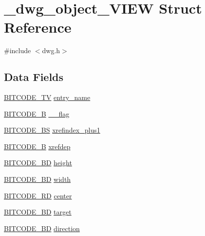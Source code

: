 \hypertarget{struct__dwg__object__VIEW}{\section{\-\_\-dwg\-\_\-object\-\_\-\-V\-I\-E\-W \-Struct \-Reference}
\label{struct__dwg__object__VIEW}
}


{\ttfamily \#include $<$dwg.\-h$>$}

\subsection*{\-Data \-Fields}
\begin{DoxyCompactItemize}
\item 
\hyperlink{dwg_8h_a2a7e040c6e36ca039b03608679ecaf7c}{\-B\-I\-T\-C\-O\-D\-E\-\_\-\-T\-V} \hyperlink{struct__dwg__object__VIEW_a34dffbd307472fa22e0412e245f2cf32}{entry\-\_\-name}
\item 
\hyperlink{dwg_8h_ab533b1f62d9086749e3bb5b67e9f224e}{\-B\-I\-T\-C\-O\-D\-E\-\_\-\-B} \hyperlink{struct__dwg__object__VIEW_a859a13eb3187861575764a50245f8a14}{\-\_\-\_\-flag}
\item 
\hyperlink{dwg_8h_a94297606fbd4a4ff97e8add284af0809}{\-B\-I\-T\-C\-O\-D\-E\-\_\-\-B\-S} \hyperlink{struct__dwg__object__VIEW_a5f8c7efab8121c734516ca8b410fe20c}{xrefindex\-\_\-plus1}
\item 
\hyperlink{dwg_8h_ab533b1f62d9086749e3bb5b67e9f224e}{\-B\-I\-T\-C\-O\-D\-E\-\_\-\-B} \hyperlink{struct__dwg__object__VIEW_a87e7ed6235d0076f324ed9514744d49a}{xrefdep}
\item 
\hyperlink{dwg_8h_a3c1e6781466b74ba07785d57da70ed97}{\-B\-I\-T\-C\-O\-D\-E\-\_\-\-B\-D} \hyperlink{struct__dwg__object__VIEW_ae30f7a7f7321bfed0fb97b4eb54db4a1}{height}
\item 
\hyperlink{dwg_8h_a3c1e6781466b74ba07785d57da70ed97}{\-B\-I\-T\-C\-O\-D\-E\-\_\-\-B\-D} \hyperlink{struct__dwg__object__VIEW_a38799e240242ea8e5d07258a7b08ce44}{width}
\item 
\hyperlink{dwg_8h_a1d23a9bc9a02453876b244dc6706f6a6}{\-B\-I\-T\-C\-O\-D\-E\-\_\-R\-D} \hyperlink{struct__dwg__object__VIEW_a3982789e0ebb4dbba12aa46ab6a440e8}{center}
\item 
\hyperlink{dwg_8h_a00698ef1bb072aa0a9360c6fc1c57587}{\-B\-I\-T\-C\-O\-D\-E\-\_\-B\-D} \hyperlink{struct__dwg__object__VIEW_af5ec7e3e762db4017c16545e3bbd3f56}{target}
\item 
\hyperlink{dwg_8h_a00698ef1bb072aa0a9360c6fc1c57587}{\-B\-I\-T\-C\-O\-D\-E\-\_\-B\-D} \hyperlink{struct__dwg__object__VIEW_a323ff661baa6d3caefdfafebf4ea8a42}{direction}

\end{DoxyCompactItemize}

